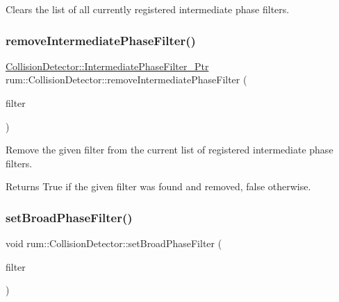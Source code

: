 Clears the list of all currently registered intermediate phase filters. \mbox{\label{classrum_1_1_collision_detector_a94446ddd3ad221a5403288f91fc538d9}} 
\subsubsection{\texorpdfstring{remove\+Intermediate\+Phase\+Filter()}{removeIntermediatePhaseFilter()}}
{\footnotesize\ttfamily \mbox{\hyperlink{classrum_1_1_collision_detector_aa1a7155543cdbe0265865b3e6f14b260}{Collision\+Detector\+::\+Intermediate\+Phase\+Filter\+\_\+\+Ptr}} rum\+::\+Collision\+Detector\+::remove\+Intermediate\+Phase\+Filter (\begin{DoxyParamCaption}\item[{\mbox{\hyperlink{classrum_1_1_i_intermediate_phase_filter}{I\+Intermediate\+Phase\+Filter}} $\ast$}]{filter }\end{DoxyParamCaption})}

Remove the given filter from the current list of registered intermediate phase filters. \begin{DoxyReturn}{Returns}
True if the given filter was found and removed, false otherwise. 
\end{DoxyReturn}
\mbox{\label{classrum_1_1_collision_detector_aa79501a56911cc6ea64e53278bedb2cb}} 
\subsubsection{\texorpdfstring{set\+Broad\+Phase\+Filter()}{setBroadPhaseFilter()}}
{\footnotesize\ttfamily void rum\+::\+Collision\+Detector\+::set\+Broad\+Phase\+Filter (\begin{DoxyParamCaption}\item[{\mbox{\hyperlink{classrum_1_1_collision_detector_a76f794d3db7491b5b21137c6332eccb3}{Broad\+Phase\+Filter\+\_\+\+Ptr}}}]{filter }\end{DoxyParamCaption})}

